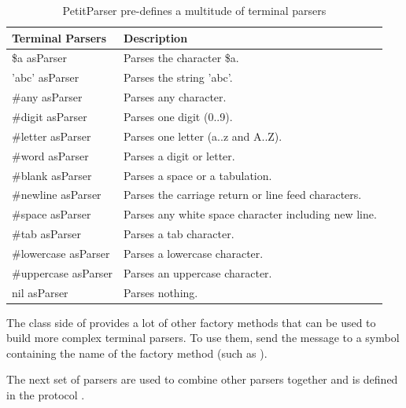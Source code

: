 \documentclass[a4paper,10pt,twoside]{book}
\begin{document}
\begin{table}
  \centering
  \begin{tabular}{ll}
    \textbf{Terminal Parsers} & \textbf{Description}                                \\
    \midrule
    \$a asParser              & Parses the character \$a.                           \\
    'abc' asParser            & Parses the string 'abc'.                            \\
    \#any asParser            & Parses any character.                               \\
    \#digit asParser          & Parses one digit (0..9).                            \\
    \#letter asParser         & Parses one letter (a..z and A..Z).                  \\
    \#word asParser           & Parses a digit or letter.                           \\
    \#blank asParser          & Parses a space or a tabulation.                     \\
    \#newline asParser        & Parses the carriage return or line feed characters. \\
    \#space asParser          & Parses any white space character including new line.\\
    \#tab asParser            & Parses a tab character.                       \\
    \#lowercase asParser      & Parses a lowercase character.                       \\
    \#uppercase asParser      & Parses an uppercase character.                      \\
    nil asParser	          & Parses nothing.                                     \\
  \end{tabular}
  \caption{PetitParser pre-defines a multitude of terminal parsers}
  \label{tab:terminal-parsers}
\end{table}

The class side of  provides a lot of
other factory methods that can be used to build more complex terminal
parsers. To use them, send the message  to a symbol
containing the name of the factory method (such as 
).

The next set of parsers are used to combine other parsers together and
is defined in the protocol .
\end{document}
